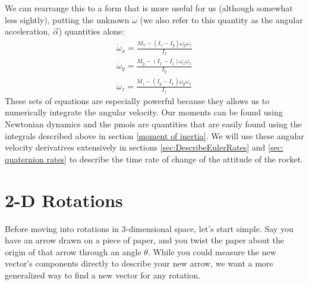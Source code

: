 \documentclass[12pt]{report}
\begin{document}
We can rearrange this to a form that is more useful for us (although somewhat less sightly), putting the unknown $\dot\omega$ (we also refer to this quantity as the angular acceleration, $\vec{\alpha}$) quantities alone:
\begin{gather}\label{eq: moment eq 2}
    \dot{\omega}_x=\frac{M_x-\left(I_z-I_y\right)\omega_y\omega_z}{I_x}\\
    \dot{\omega}_y=\frac{M_y-\left(I_x-I_z\right)\omega_z\omega_x}{I_y}\\
    \dot{\omega}_z=\frac{M_z-\left(I_y-I_x\right)\omega_y\omega_x}{I_z}
\end{gather}
These sets of equations are especially powerful because they allows us to numerically integrate the angular velocity. Our moments can be found using Newtonian dynamics and the \glspl{pmoi} are quantities that are easily found using the integrals described above in section \ref{moment of inertia}. We will use these angular velocity derivatives extensively in sections \ref{sec:DescribeEulerRates} and \ref{sec: quaternion rates} to describe the time rate of change of the attitude of the rocket.
\section{2-D Rotations}\label{sec:2D Rotations}
Before moving into rotations in 3-dimensional space, let’s start simple. Say you have an arrow drawn on a piece of paper, and you twist the paper about the origin of that arrow through an angle $\theta$. While you could measure the new vector’s components directly to describe your new arrow, we want a more generalized way to find a new vector for any rotation. 
\end{document}
